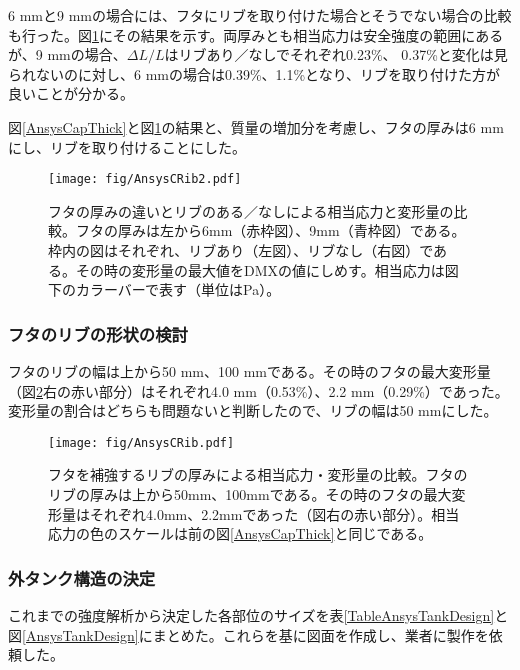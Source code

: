 \documentclass[11pt]{ltjsreport}
\newcommand{\figref}[1]{図\ref{#1}}
\newcommand{\tabref}[1]{表\ref{#1}}
\begin{document}
6 mmと9 mmの場合には、フタにリブを取り付けた場合とそうでない場合の比較も行った。\figref{AnsysCRib2}にその結果を示す。両厚みとも相当応力は安全強度の範囲にあるが、9 mmの場合、$\Delta L/L$はリブあり／なしでそれぞれ0.23\%、 0.37\%と変化は見られないのに対し、6 mmの場合は0.39\%、1.1\%となり、リブを取り付けた方が良いことが分かる。

\figref{AnsysCapThick}と\figref{AnsysCRib2}の結果と、質量の増加分を考慮し、フタの厚みは6 mmにし、リブを取り付けることにした。

\begin{figure}[htbp]
\centering
\texttt{[image: fig/AnsysCRib2.pdf]}
\caption[フタの厚みの違いとリブのある／なしよる相当応力と変形量の比較]{フタの厚みの違いとリブのある／なしによる相当応力と変形量の比較。フタの厚みは左から6mm（赤枠図）、9mm（青枠図）である。枠内の図はそれぞれ、リブあり（左図）、リブなし（右図）である。その時の変形量の最大値をDMXの値にしめす。相当応力は図下のカラーバーで表す（単位はPa）。}
\label{AnsysCRib2}
\end{figure}


\subsubsection{フタのリブの形状の検討}
フタのリブの幅は上から50 mm、100 mmである。その時のフタの最大変形量（\figref{AnsysCRib}右の赤い部分）はそれぞれ4.0 mm（0.53\%）、2.2 mm（0.29\%）であった。変形量の割合はどちらも問題ないと判断したので、リブの幅は50 mmにした。

\begin{figure}[!h]
\centering
\texttt{[image: fig/AnsysCRib.pdf]}
\caption[フタを補強するリブの厚みによる相当応力・変形量の比較]{フタを補強するリブの厚みによる相当応力・変形量の比較。フタのリブの厚みは上から50mm、100mmである。その時のフタの最大変形量はそれぞれ4.0mm、2.2mmであった（図右の赤い部分）。相当応力の色のスケールは前の\figref{AnsysCapThick}と同じである。}
\label{AnsysCRib}
\end{figure}

\newpage
\subsubsection{外タンク構造の決定}
これまでの強度解析から決定した各部位のサイズを\tabref{TableAnsysTankDesign}と\figref{AnsysTankDesign}にまとめた。これらを基に図面を作成し、業者に製作を依頼した。
\end{document}
